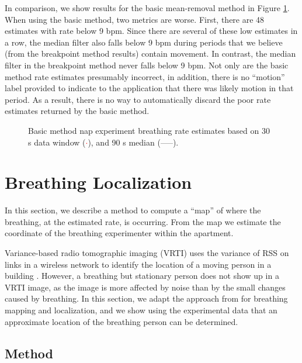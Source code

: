 \documentclass[10pt,journal,letterpaper]{IEEEtran}
\begin{document}
In comparison, we show results for the basic mean-removal method in Figure \ref{F:nap_fHat_basic_median_vs_time}.  When using the basic method, two metrics are worse.  First, there are 48 estimates with rate below 9 bpm.  Since there are several of these low estimates in a row, the median filter also falls below 9 bpm during periods that we believe (from the breakpoint method results) contain movement.  In contrast, the median filter in the breakpoint method never falls below 9 bpm.  Not only are the basic method rate estimates presumably incorrect, in addition, there is no ``motion'' label provided to indicate to the application that there was likely motion in that period.  As a result, there is no way to automatically discard the poor rate estimates returned by the basic method.


\begin{figure}[htbp]
\centerline{ }
\caption{Basic method nap experiment breathing rate estimates based on 30 s data window (\textcolor{red}{$\cdot$}), and 90 s median (\textcolor{Mulberry}{-----}).  }
    \label{F:nap_fHat_basic_median_vs_time}
\end{figure}



\section{Breathing Localization} \label{S:Localization}

In this section, we describe a method to compute a ``map'' of where the breathing, at the estimated rate, is occurring.  From the map we estimate the coordinate of the breathing experimenter within the apartment.

Variance-based radio tomographic imaging (VRTI) uses the variance of RSS on links in a wireless network to identify the location of a moving person in a building \cite{wilson10see}.  However, a breathing but stationary person does not show up in a VRTI image, as the image is more affected by noise than by the small changes caused by breathing.  In this section, we adapt the approach from \cite{wilson10see} for breathing mapping and localization, and we show using the experimental data that an approximate location of the breathing person can be determined.

\subsection{Method}
\end{document}
